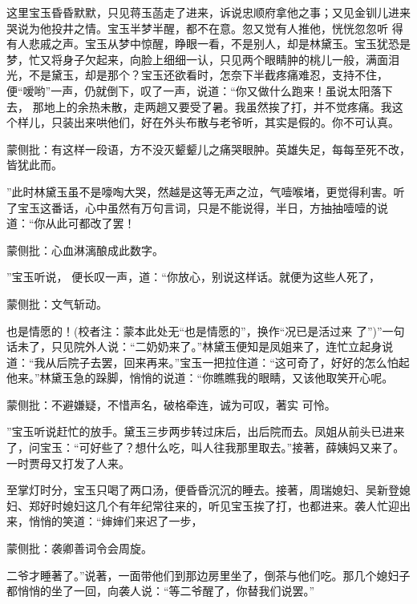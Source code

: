 \begin{parag}
    这里宝玉昏昏默默，只见蒋玉菡走了进来，诉说忠顺府拿他之事；又见金钏儿进来哭说为他投井之情。宝玉半梦半醒，都不在意。忽又觉有人推他，恍恍忽忽听 得有人悲戚之声。宝玉从梦中惊醒，睁眼一看，不是别人，却是林黛玉。宝玉犹恐是梦，忙又将身子欠起来，向脸上细细一认，只见两个眼睛肿的桃儿一般，满面泪光，不是黛玉，却是那个？宝玉还欲看时，怎奈下半截疼痛难忍，支持不住，便“嗳哟”一声，仍就倒下，叹了一声，说道：“你又做什么跑来！虽说太阳落下去， 那地上的余热未散，走两趟又要受了暑。我虽然挨了打，并不觉疼痛。我这个样儿，只装出来哄他们，好在外头布散与老爷听，其实是假的。你不可认真。\begin{note}蒙侧批：有这样一段语，方不没灭颦颦儿之痛哭眼肿。英雄失足，每每至死不改，皆犹此而。\end{note}”此时林黛玉虽不是嚎啕大哭，然越是这等无声之泣，气噎喉堵，更觉得利害。听了宝玉这番话，心中虽然有万句言词，只是不能说得，半日，方抽抽噎噎的说道：“你从此可都改了罢！\begin{note}蒙侧批：心血淋漓酿成此数字。\end{note}”宝玉听说， 便长叹一声，道：“你放心，别说这样话。就便为这些人死了，\begin{note}蒙侧批：文气斩动。\end{note}也是情愿的！(校者注：蒙本此处无“也是情愿的”，换作“况已是活过来 了”)”一句话未了，只见院外人说：“二奶奶来了。”林黛玉便知是凤姐来了，连忙立起身说道：“我从后院子去罢，回来再来。”宝玉一把拉住道：“这可奇了，好好的怎么怕起他来。”林黛玉急的跺脚，悄悄的说道：“你瞧瞧我的眼睛，又该他取笑开心呢。\begin{note}蒙侧批：不避嫌疑，不惜声名，破格牵连，诚为可叹，著实 可怜。\end{note}”宝玉听说赶忙的放手。黛玉三步两步转过床后，出后院而去。凤姐从前头已进来了，问宝玉：“可好些了？想什么吃，叫人往我那里取去。”接著，薛姨妈又来了。一时贾母又打发了人来。
\end{parag}


\begin{parag}
    至掌灯时分，宝玉只喝了两口汤，便昏昏沉沉的睡去。接著，周瑞媳妇、吴新登媳妇、郑好时媳妇这几个有年纪常往来的，听见宝玉挨了打，也都进来。袭人忙迎出来，悄悄的笑道：“婶婶们来迟了一步，\begin{note}蒙侧批：袭卿善词令会周旋。\end{note}二爷才睡著了。”说著，一面带他们到那边房里坐了，倒茶与他们吃。那几个媳妇子都悄悄的坐了一回，向袭人说：“等二爷醒了，你替我们说罢。”
\end{parag}


